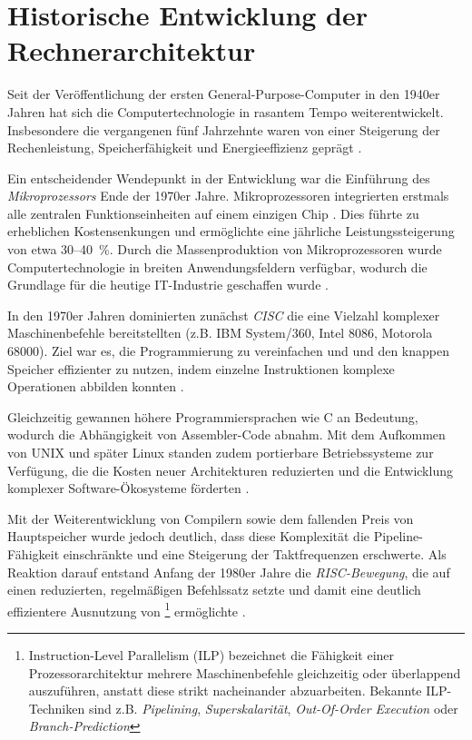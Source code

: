 \section{Historische Entwicklung der Rechnerarchitektur}\label{chap:3-3-development_ca}

Seit der Veröffentlichung der ersten General-Purpose-Computer in den 1940er Jahren hat sich die Computertechnologie in rasantem Tempo weiterentwickelt. Insbesondere die vergangenen fünf Jahrzehnte waren von einer Steigerung der Rechenleistung, Speicherfähigkeit und Energieeffizienz geprägt \parencite[S.~2]{hennessy_computer_2011}.

Ein entscheidender Wendepunkt in der Entwicklung war die Einführung des \textit{Mikroprozessors} Ende der 1970er Jahre. Mikroprozessoren integrierten erstmals alle zentralen Funktionseinheiten auf einem einzigen Chip \parencite[S.~9]{dumas_ii_computer_2006}. Dies führte zu erheblichen Kostensenkungen und ermöglichte eine jährliche Leistungssteigerung von etwa 30–40~\%. Durch die Massenproduktion von Mikroprozessoren wurde Computertechnologie in breiten Anwendungsfeldern verfügbar, wodurch die Grundlage für die heutige IT-Industrie geschaffen wurde \parencites[S.~2]{hennessy_computer_2011}[S.~11]{dumas_ii_computer_2006}.

In den 1970er Jahren dominierten zunächst \textit{\ac{CISC}} die eine Vielzahl komplexer Maschinenbefehle bereitstellten (z.B. IBM System/360, Intel 8086, Motorola 68000). Ziel war es, die Programmierung zu vereinfachen und und den knappen Speicher effizienter zu nutzen, indem einzelne Instruktionen komplexe Operationen abbilden konnten \parencite[S.~12]{dumas_ii_computer_2006}.

Gleichzeitig gewannen höhere Programmiersprachen wie C an Bedeutung, wodurch die Abhängigkeit von Assembler-Code abnahm. Mit dem Aufkommen von UNIX und später Linux standen zudem portierbare Betriebssysteme zur Verfügung, die die Kosten neuer Architekturen reduzierten und die Entwicklung komplexer Software-Ökosysteme förderten \parencites[S.~2]{hennessy_computer_2011}[S.~12]{dumas_ii_computer_2006}.

Mit der Weiterentwicklung von Compilern sowie dem fallenden Preis von Hauptspeicher wurde jedoch deutlich, dass diese Komplexität die Pipeline-Fähigkeit einschränkte und eine Steigerung der Taktfrequenzen erschwerte. Als Reaktion darauf entstand Anfang der 1980er Jahre die \textit{\ac{RISC}-Bewegung}, die auf einen reduzierten, regelmäßigen Befehlssatz setzte und damit eine deutlich effizientere Ausnutzung von \footnote{Instruction-Level Parallelism (ILP) bezeichnet die Fähigkeit einer Prozessorarchitektur mehrere Maschinenbefehle gleichzeitig oder überlappend auszuführen, anstatt diese strikt nacheinander abzuarbeiten. Bekannte ILP-Techniken sind z.B. \textit{Pipelining}, \textit{Superskalarität}, \textit{Out-Of-Order Execution} oder \textit{Branch-Prediction}} ermöglichte \parencite[S.~2]{hennessy_computer_2011}.  

